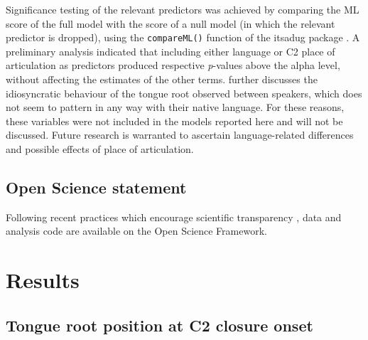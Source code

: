 \documentclass[12pt,]{article}
\begin{document}
Significance testing of the relevant predictors was achieved by
comparing the ML score of the full model with the score of a null model
(in which the relevant predictor is dropped), using the
\texttt{compareML()} function of the itsadug package
\citep{van-rij2017}. A preliminary analysis indicated that including
either language or C2 place of articulation as predictors produced
respective \emph{p}-values above the alpha level, without affecting the
estimates of the other terms.  further discusses the
idiosyncratic behaviour of the tongue root observed between speakers,
which does not seem to pattern in any way with their native language.
For these reasons, these variables were not included in the models
reported here and will not be discussed. Future research is warranted to
ascertain language-related differences and possible effects of place of
articulation.

\hypertarget{open-science-statement}{%
\subsection{Open Science statement}\label{open-science-statement}}

Following recent practices which encourage scientific transparency
\citep{cruwell2018, berez-kroeker2018, roettger2019}, data and analysis
code are available on the Open Science Framework.

\hypertarget{results}{%
\section{Results}\label{results}}

\label{s:results}

\hypertarget{tongue-root-position-at-c2-closure-onset}{%
\subsection{Tongue root position at C2 closure
onset}\label{tongue-root-position-at-c2-closure-onset}}

\label{s:tra-lm}
\end{document}
